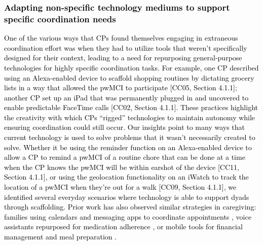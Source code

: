 \documentclass[acmsmall]{acmart}
\begin{document}
\textcolor{black}{\subsubsection{Adapting non-specific technology mediums to support specific coordination needs}
One of the various ways that CPs found themselves engaging in extraneous coordination effort was when they had to utilize tools that weren't specifically designed for their context, leading to a need for repurposing general-purpose technologies for highly specific coordination tasks. For example, \textcolor{black}{one} CP described using \textcolor{black}{an} Alexa-enabled device to scaffold shopping routines by dictating grocery lists in \textcolor{black}{a} way that allowed the pwMCI to participate [CC05\textcolor{black}{, Section 4.1.1}]\textcolor{black}{; another CP set up an} iPad that \textcolor{black}{was} permanently plugged in and uncovered to enable predictable FaceTime calls [CC02\textcolor{black}{, Section 4.1.1}]. These practices highlight the creativity with which CPs “rigged” technologies to maintain autonomy while ensuring coordination could still occur. Our insights point to many ways that current technology is used to solve problems that it wasn’t necessarily created to solve. Whether it be using the reminder function on an Alexa-enabled device to allow a CP to remind a pwMCI of a routine chore that can be done at a time \textcolor{black}{when} the CP knows \textcolor{black}{the pwMCI} will be within earshot of the device [CC11\textcolor{black}{, Section 4.1.1}], or \textcolor{black}{using the geolocation functionality on an iWatch to track the location of a pwMCI when they’re out for a walk [CC09, Section 4.1.1]}, we identified several everyday scenarios \textcolor{black}{where} technology is able to support dyads through scaffolding. Prior work has also observed similar strategies in caregiving: families using calendars and messaging apps to coordinate appointments \cite{yamashita2018information, renyi2022uncovering}, voice assistants repurposed for medication adherence \cite{mathur2022collaborative}, or mobile tools for financial management \cite{chan2025insights, dai2025envisioning} and meal preparation \cite{chan2025insights}.} 
\end{document}
